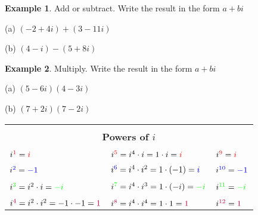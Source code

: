 \documentclass{report}
\theoremstyle{definition}
\newtheorem{example}{\bf Example}
\begin{document}
 \newpage

\begin{example}
Add or subtract. Write the result in the form $a+bi$
\end{example}


 \begin{minipage}[t]{0.45\linewidth}
 (a)  $(-2+4i)+(3-11i)$ 
 \end{minipage}
 \hfill
 \begin{minipage}[t]{0.45\linewidth}
 (b)  $(4-i)-(5+8i)$
 \end{minipage}
 
 \vspace{2cm}
 
 
 \begin{example}
 Multiply. Write the result in the form $a+bi$
 \end{example}
 
  \begin{minipage}[t]{0.45\linewidth}
 (a)  $(5-6i)(4-3i)$
 \end{minipage}
 \hfill
 \begin{minipage}[t]{0.45\linewidth}
 (b) $(7+2i)(7-2i)$
 \end{minipage}
 
  \vspace{2cm}
 
 
 \begin{center}
	 \begin{tabular}[t]{|l|l|l|}
	 \hline
	 \multicolumn{3}{|c|}{}\\
	 \multicolumn{3}{|c|}{\textbf{Powers of $i$}}\\
	 \hline
	 &&\\
	 $i^{\color{red}1\color{black}}=\color{red}i\color{black}$ & $i^{\color{red}5\color{black}}=i^4\cdot i=1\cdot i =\color{red} i\color{black}$ & $i^{\color{red}9\color{black}}=\color{red} i\color{black}$\\
	 \hline
	 &&\\
	  $i^{\color{blue}2\color{black}}=\color{blue}-1\color{black}$ & $i^{\color{blue}6\color{black}}=i^4\cdot i^2=1\cdot (-1) =\color{blue} i\color{black}$ & $i^{\color{blue}10\color{black}}=\color{blue} -1\color{black}$\\
	  \hline
	   &&\\
	  $i^{\color{green}3\color{black}}=i^2\cdot i = \color{green}-i\color{black}$ & $i^{\color{green}7\color{black}}=i^4\cdot i^3=1\cdot (-i) =\color{green} -i\color{black}$ & $i^{\color{green}11\color{black}}=\color{green} -i\color{black}$\\
	  \hline
	   &&\\
	  $i^{\color{purple}4\color{black}}=i^2\cdot i^2 = -1 \cdot -1 =  \color{purple} 1\color{black}$ & $i^{\color{purple}8\color{black}}=i^4\cdot i^4=1\cdot 1 =\color{purple} 1\color{black}$ & $i^{\color{purple}12\color{black}}=\color{purple} 1\color{black}$\\
	  \hline
	\end{tabular}
 \end{center}
 
\end{document}
